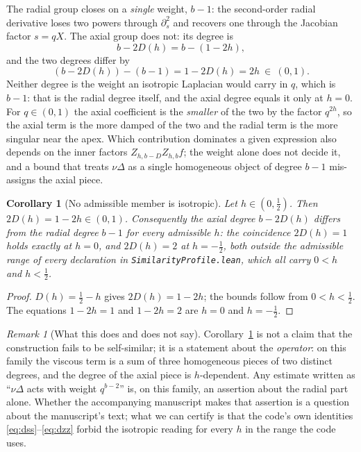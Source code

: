 \documentclass[11pt]{article}
\newcommand{\file}[1]{\texttt{\small #1}}
\theoremstyle{plain}
\newtheorem{corollary}[theorem]{Corollary}
\theoremstyle{definition}
\theoremstyle{remark}
\newtheorem{remark}[theorem]{Remark}
\begin{document}
The radial group closes on a \emph{single} weight, $b-1$: the second-order
radial derivative loses two powers through $\partial_s^{2}$ and recovers one
through the Jacobian factor $s=qX$. The axial group does not: its degree is
\begin{equation}
  b-2D(h)=b-(1-2h),
  \label{eq:degrees}
\end{equation}
and the two degrees differ by
\begin{equation}
  (b-2D(h))-(b-1)=1-2D(h)=2h\ \in\ (0,1).
  \label{eq:deficit}
\end{equation}
Neither degree is the weight an isotropic Laplacian would carry in $q$, which is
$b-1$: that is the radial degree itself, and the axial degree equals it only at
$h=0$. For $q\in(0,1)$ the axial coefficient is the \emph{smaller} of the two by
the factor $q^{2h}$, so the axial term is the more damped of the two and the
radial term is the more singular near the apex. Which contribution dominates a given
expression also depends on the inner factors $Z_{h,b-D}Z_{h,b}f$; the weight
alone does not decide it, and a bound that treats $\nu\Delta$ as a single
homogeneous object of degree $b-1$ mis-assigns the axial piece.

\begin{corollary}[No admissible member is isotropic]
\label{cor:noiso}
Let $h\in(0,\tfrac12)$. Then $2D(h)=1-2h\in(0,1)$. Consequently the axial
degree $b-2D(h)$ differs from the radial degree $b-1$ for every admissible $h$:
the coincidence $2D(h)=1$ holds exactly at $h=0$, and $2D(h)=2$ at
$h=-\tfrac12$, both outside the admissible range of every declaration in
\file{SimilarityProfile.lean}, which all carry $0<h$ and $h<\tfrac12$.
\end{corollary}

\begin{proof}
$D(h)=\tfrac12-h$ gives $2D(h)=1-2h$; the bounds follow from $0<h<\tfrac12$.
The equations $1-2h=1$ and $1-2h=2$ are $h=0$ and $h=-\tfrac12$.
\end{proof}

\begin{remark}[What this does and does not say]
\label{rem:scoping}
Corollary~\ref{cor:noiso} is not a claim that the construction fails to be
self-similar; it is a statement about the \emph{operator}: on this family the
viscous term is a sum of three homogeneous pieces of two distinct degrees, and the
degree of the axial piece is $h$-dependent. Any estimate written as
``$\nu\Delta$ acts with weight $q^{b-2}$'' is, on this family, an assertion about
the radial part alone. Whether the accompanying manuscript makes that assertion
is a question about the manuscript's text; what we can certify is that the code's
own identities \eqref{eq:dss}--\eqref{eq:dzz} forbid the isotropic reading for
every $h$ in the range the code uses.
\end{remark}
\end{document}

